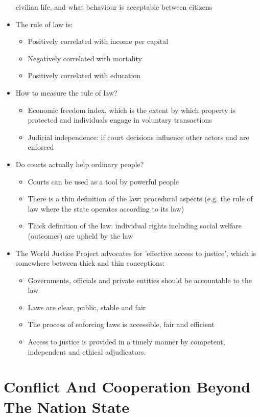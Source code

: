 \documentclass[11pt]{article}
\begin{document}
\begin{itemize}
civilian life, and what behaviour is acceptable between citizens
\item The rule of law is:
\begin{itemize}
\item Positively correlated with income per capital
\item Negatively correlated with mortality
\item Positively correlated with education
\end{itemize}
\item How to measure the rule of law?
\begin{itemize}
\item Economic freedom index, which is the extent by which property is protected
and individuals engage in voluntary transactions
\item Judicial independence: if court decisions influence other actors and are
enforced
\end{itemize}
\item Do courts actually help ordinary people?
\begin{itemize}
\item Courts can be used as a tool by powerful people
\item There is a thin definition of the law: procedural aspects (e.g. the rule of
law where the state operates according to its law)
\item Thick definition of the law: individual rights including social welfare
(outcomes) are upheld by the law
\end{itemize}
\item The World Justice Project advocates for 'effective access to justice', which
is somewhere between thick and thin conceptions:
\begin{itemize}
\item Governments, officials and private entities should be accountable to the law
\item Laws are clear, public, stable and fair
\item The process of enforcing laws is accessible, fair and efficient
\item Access to justice is provided in a timely manner by competent, independent
and ethical adjudicators.
\end{itemize}
\end{itemize}
\section{Conflict And Cooperation Beyond The Nation State}
\label{sec:org11a182a}
\end{document}
